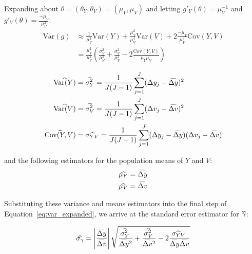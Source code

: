 Expanding about $\theta=(\theta_Y,\theta_V)=(\mu_Y,\mu_V)$ and letting $g'_Y(\theta) = \mu_V^{-1}$ and $g'_V(\theta) = \frac{-\mu_Y}{\mu_V^{2}}$:
\begin{equation} \label{eq:var_expanded}
	\begin{split}
		\text{Var}(g) & \approx \frac{1}{\mu_V^2}\text{Var}(Y) + \frac{\mu_Y^2}{\mu_V^4}\text{Var}(V) + 2\frac{-\mu_Y}{\mu_V^{3}}\text{Cov}(Y,V)  \\
		              & = \frac{\mu_Y^2}{\mu_V^2}(\frac{\sigma_Y^2}{\mu_Y^2} + \frac{\sigma_V^2}{\mu_V^2} - 2\frac{\text{Cov}(Y,V)}{\mu_Y \mu_V})
	\end{split}
\end{equation}

\begin{equation}
	\begin{split}
		\wh{\text{Var}(Y)}   & = \wh{\sigma_Y^2} = \frac{1}{J(J-1)}\sum_{j=1}^{J} (\Delta y_j - \wb{\Delta y})^2                            \\
		\wh{\text{Var}(V)}   & = \wh{\sigma_V^2} = \frac{1}{J(J-1)}\sum_{j=1}^{J} (\Delta v_j - \wb{\Delta v})^2                            \\
		\wh{\text{Cov}(Y,V)} & = \wh{\sigma_{YV}} = \frac{1}{J(J-1)}\sum_{j=1}^{J} (\Delta y_j - \wb{\Delta y})(\Delta v_j - \wb{\Delta v})
	\end{split}\label{eq:equation3}
\end{equation}

and the following estimators for the population means of $Y$ and $V$:
\begin{equation}
	\begin{split}
		\wh{\mu_Y} & = \wb{\Delta y} \\
		\wh{\mu_V} & = \wb{\Delta v}
	\end{split}\label{eq:equation4}
\end{equation}

Substituting these variance and means estimators into the final step of Equation~\ref{eq:var_expanded}, we arrive at the standard error estimator for $\wh{\gamma}$:

\begin{equation}
	\wh{\sigma_{\gamma}} = \left|\frac{\wb{\Delta y}}{\wb{\Delta v}}\right| \sqrt{ \frac{\wh{\sigma_Y^2}}{\wb{\Delta y}^2} + \frac{\wh{\sigma_V^2}}{\wb{\Delta v}^2} - 2 \frac{\wh{\sigma_{YV}}}{\wb{\Delta y} \wb{\Delta v}} }\label{eq:equation5}
\end{equation}

